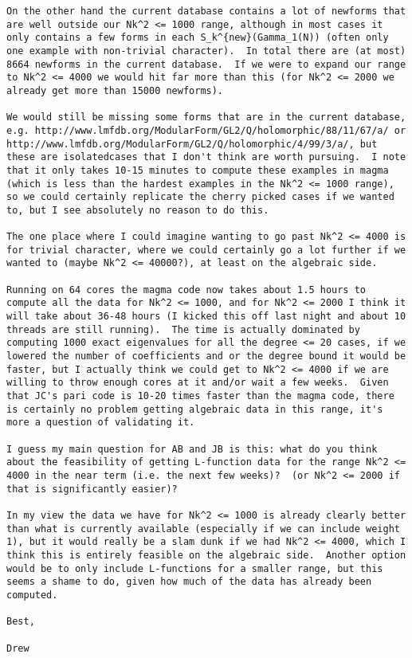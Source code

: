 \documentclass[11pt]{amsart}
\numberwithin{equation}{subsection}
\theoremstyle{definition}
\begin{document}
\begin{verbatim}
On the other hand the current database contains a lot of newforms that are well outside our Nk^2 <= 1000 range, although in most cases it only contains a few forms in each S_k^{new}(Gamma_1(N)) (often only one example with non-trivial character).  In total there are (at most) 8664 newforms in the current database.  If we were to expand our range to Nk^2 <= 4000 we would hit far more than this (for Nk^2 <= 2000 we already get more than 15000 newforms).

We would still be missing some forms that are in the current database, e.g. http://www.lmfdb.org/ModularForm/GL2/Q/holomorphic/88/11/67/a/ or http://www.lmfdb.org/ModularForm/GL2/Q/holomorphic/4/99/3/a/, but these are isolatedcases that I don't think are worth pursuing.  I note that it only takes 10-15 minutes to compute these examples in magma (which is less than the hardest examples in the Nk^2 <= 1000 range), so we could certainly replicate the cherry picked cases if we wanted to, but I see absolutely no reason to do this.

The one place where I could imagine wanting to go past Nk^2 <= 4000 is for trivial character, where we could certainly go a lot further if we wanted to (maybe Nk^2 <= 40000?), at least on the algebraic side.

Running on 64 cores the magma code now takes about 1.5 hours to compute all the data for Nk^2 <= 1000, and for Nk^2 <= 2000 I think it will take about 36-48 hours (I kicked this off last night and about 10 threads are still running).  The time is actually dominated by computing 1000 exact eigenvalues for all the degree <= 20 cases, if we lowered the number of coefficients and or the degree bound it would be faster, but I actually think we could get to Nk^2 <= 4000 if we are willing to throw enough cores at it and/or wait a few weeks.  Given that JC's pari code is 10-20 times faster than the magma code, there is certainly no problem getting algebraic data in this range, it's more a question of validating it.

I guess my main question for AB and JB is this: what do you think about the feasibility of getting L-function data for the range Nk^2 <= 4000 in the near term (i.e. the next few weeks)?  (or Nk^2 <= 2000 if that is significantly easier)?

In my view the data we have for Nk^2 <= 1000 is already clearly better than what is currently available (especially if we can include weight 1), but it would really be a slam dunk if we had Nk^2 <= 4000, which I think this is entirely feasible on the algebraic side.  Another option would be to only include L-functions for a smaller range, but this seems a shame to do, given how much of the data has already been computed.

Best,

Drew
\end{verbatim}
\end{document}
